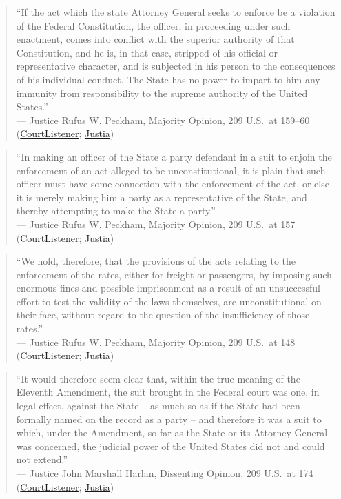 \documentclass[12pt]{article}
\begin{document}
\begin{quote}
``If the act which the state Attorney General seeks to enforce be a violation of the Federal Constitution, the officer, in proceeding under such enactment, comes into conflict with the superior authority of that Constitution, and he is, in that case, stripped of his official or representative character, and is subjected in his person to the consequences of his individual conduct. The State has no power to impart to him any immunity from responsibility to the supreme authority of the United States.''\\
--- Justice Rufus W. Peckham, Majority Opinion, 209 U.S.\ at 159--60 (\href{https://www.courtlistener.com/opinion/96819/ex-parte-young/}{CourtListener}; \href{https://supreme.justia.com/cases/federal/us/209/123/}{Justia})
\end{quote}

\begin{quote}
``In making an officer of the State a party defendant in a suit to enjoin the enforcement of an act alleged to be unconstitutional, it is plain that such officer must have some connection with the enforcement of the act, or else it is merely making him a party as a representative of the State, and thereby attempting to make the State a party.''\\
--- Justice Rufus W. Peckham, Majority Opinion, 209 U.S.\ at 157 (\href{https://www.courtlistener.com/opinion/96819/ex-parte-young/}{CourtListener}; \href{https://supreme.justia.com/cases/federal/us/209/123/}{Justia})
\end{quote}

\begin{quote}
``We hold, therefore, that the provisions of the acts relating to the enforcement of the rates, either for freight or passengers, by imposing such enormous fines and possible imprisonment as a result of an unsuccessful effort to test the validity of the laws themselves, are unconstitutional on their face, without regard to the question of the insufficiency of those rates.''\\
--- Justice Rufus W. Peckham, Majority Opinion, 209 U.S.\ at 148 (\href{https://www.courtlistener.com/opinion/96819/ex-parte-young/}{CourtListener}; \href{https://supreme.justia.com/cases/federal/us/209/123/}{Justia})
\end{quote}

\begin{quote}
``It would therefore seem clear that, within the true meaning of the Eleventh Amendment, the suit brought in the Federal court was one, in legal effect, against the State -- as much so as if the State had been formally named on the record as a party -- and therefore it was a suit to which, under the Amendment, so far as the State or its Attorney General was concerned, the judicial power of the United States did not and could not extend.''\\
--- Justice John Marshall Harlan, Dissenting Opinion, 209 U.S.\ at 174 (\href{https://www.courtlistener.com/opinion/96819/ex-parte-young/}{CourtListener}; \href{https://supreme.justia.com/cases/federal/us/209/123/}{Justia})
\end{quote}
\end{document}
